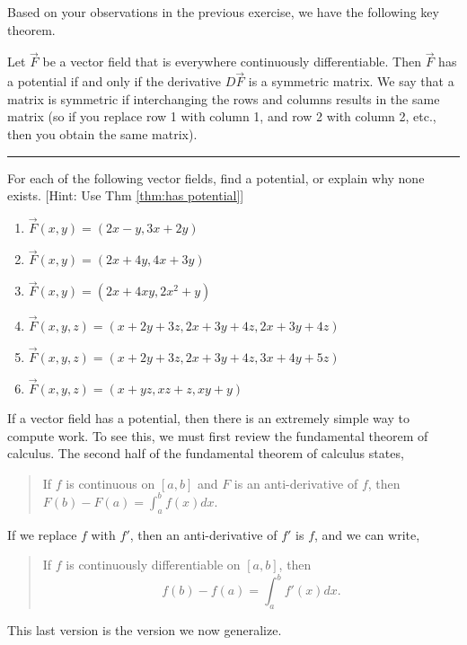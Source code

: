 Based on your observations in the previous exercise, we have the following key theorem.

\begin{theorem}\label{thm:has potential}
 Let $\vec F$ be a vector field that is everywhere continuously differentiable. Then $\vec F$ has a potential if and only if the derivative $D\vec F$ is a symmetric matrix. We say that a matrix is symmetric if interchanging the rows and columns results in the same matrix (so if you replace row 1 with column 1, and row 2 with column 2, etc., then you obtain the same matrix).  
\end{theorem}

\hrule

\newpage
\begin{problem}
%
For each of the following vector fields, find a potential, or explain why none exists. [Hint: Use Thm \ref{thm:has potential}]
\begin{enumerate}
 \item $\vec F(x,y)=(2x-y, 3x+2y)$
 \item $\vec F(x,y)=(2x+4y, 4x+3y)$
 \item $\vec F(x,y)=(2x+4xy, 2x^2+y)$
 \item $\vec F(x,y,z)=(x+2y+3z,2x+3y+4z,2x+3y+4z)$
 \item $\vec F(x,y,z)=(x+2y+3z,2x+3y+4z,3x+4y+5z)$
 \item $\vec F(x,y,z)=(x+yz,xz+z,xy+y)$
\end{enumerate}
\end{problem}


If a vector field has a potential, then there is an extremely simple way to compute work. To see this, we must first review the fundamental theorem of calculus. The second half of the fundamental theorem of calculus states,
\begin{quote}
 If $f$ is continuous on $[a,b]$ and $F$ is an anti-derivative of $f$, then $F(b)-F(a) = \int_a^b f(x) dx$.
\end{quote}
If we replace $f$ with $f'$, then an anti-derivative of $f'$ is $f$, and we can write,
\begin{quote}
 If $f$ is continuously differentiable on $[a,b]$, then $$f(b)-f(a)=\int_a^b f'(x) dx.$$
\end{quote}
This last version is the version we now generalize.

